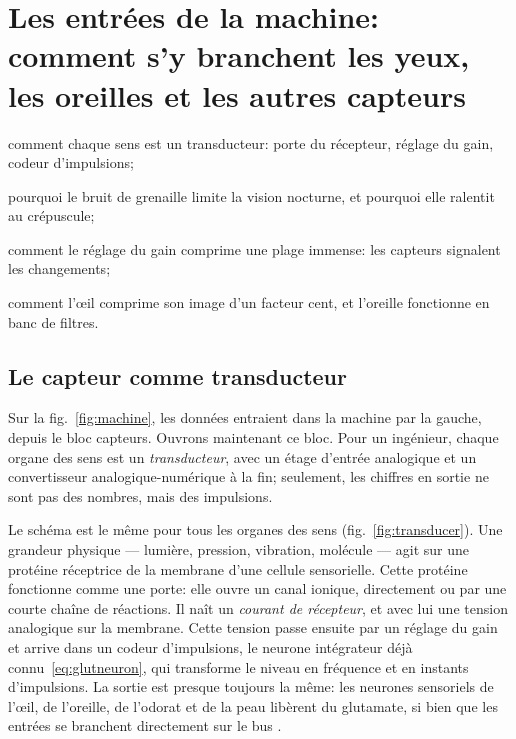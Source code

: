 \chapter{Les entrées de la machine: comment s'y branchent les yeux, les oreilles et les autres capteurs}
\label{sec:sensors}
\begin{chaptergoals}
\item comment chaque sens est un transducteur: porte du récepteur, réglage du gain, codeur d'impulsions;
\item pourquoi le bruit de grenaille limite la vision nocturne, et pourquoi elle ralentit au crépuscule;
\item comment le réglage du gain comprime une plage immense: les capteurs signalent les changements;
\item comment l'œil comprime son image d'un facteur cent, et l'oreille fonctionne en banc de filtres.
\end{chaptergoals}

\section{Le capteur comme transducteur}

Sur la fig.~\ref{fig:machine}, les données entraient dans la machine par la gauche, depuis le bloc \og capteurs\fg{}. Ouvrons maintenant ce bloc. Pour un ingénieur, chaque organe des sens est un \emph{transducteur}, avec un étage d'entrée analogique et un convertisseur analogique-numérique à la fin; seulement, les chiffres en sortie ne sont pas des nombres, mais des impulsions.

Le schéma est le même pour tous les organes des sens (fig.~\ref{fig:transducer}). Une grandeur physique --- lumière, pression, vibration, molécule --- agit sur une protéine réceptrice de la membrane d'une cellule sensorielle. Cette protéine fonctionne comme une porte: elle ouvre un canal ionique, directement ou par une courte chaîne de réactions. Il naît un \emph{courant de récepteur}, et avec lui une tension analogique sur la membrane. Cette tension passe ensuite par un réglage du gain et arrive dans un codeur d'impulsions, le neurone intégrateur déjà connu~\eqref{eq:glutneuron}, qui transforme le niveau en fréquence et en instants d'impulsions. La sortie est presque toujours la même: les neurones sensoriels de l'œil, de l'oreille, de l'odorat et de la peau libèrent du glutamate, si bien que les entrées se branchent directement sur le bus .

